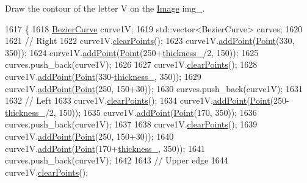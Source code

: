 Draw the contour of the letter V on the \mbox{\hyperlink{class_image}{Image}} img\+\_\+. 


\begin{DoxyCode}
1617                \{
1618     \mbox{\hyperlink{class_bezier_curve}{BezierCurve}} curve1V;
1619     std::vector<BezierCurve> curves;
1620 
1621     \textcolor{comment}{// Right}
1622     curve1V.\mbox{\hyperlink{class_bezier_curve_a0ba8ce66d5af5971ae6a1b506029728e}{clearPoints}}();
1623     curve1V.\mbox{\hyperlink{class_bezier_curve_a38d16c18b36ae45619b05e26e226cf34}{addPoint}}(\mbox{\hyperlink{class_point}{Point}}(330, 350));
1624     curve1V.\mbox{\hyperlink{class_bezier_curve_a38d16c18b36ae45619b05e26e226cf34}{addPoint}}(\mbox{\hyperlink{class_point}{Point}}(250+\mbox{\hyperlink{class_font_v1_aed8040e76be9a52833627b92f0fb4e5f}{thickness\_}}/2, 150));
1625     curves.push\_back(curve1V);
1626 
1627     curve1V.\mbox{\hyperlink{class_bezier_curve_a0ba8ce66d5af5971ae6a1b506029728e}{clearPoints}}();
1628     curve1V.\mbox{\hyperlink{class_bezier_curve_a38d16c18b36ae45619b05e26e226cf34}{addPoint}}(\mbox{\hyperlink{class_point}{Point}}(330-\mbox{\hyperlink{class_font_v1_aed8040e76be9a52833627b92f0fb4e5f}{thickness\_}}, 350));
1629     curve1V.\mbox{\hyperlink{class_bezier_curve_a38d16c18b36ae45619b05e26e226cf34}{addPoint}}(\mbox{\hyperlink{class_point}{Point}}(250, 150+30));
1630     curves.push\_back(curve1V);
1631 
1632     \textcolor{comment}{// Left}
1633     curve1V.\mbox{\hyperlink{class_bezier_curve_a0ba8ce66d5af5971ae6a1b506029728e}{clearPoints}}();
1634     curve1V.\mbox{\hyperlink{class_bezier_curve_a38d16c18b36ae45619b05e26e226cf34}{addPoint}}(\mbox{\hyperlink{class_point}{Point}}(250-\mbox{\hyperlink{class_font_v1_aed8040e76be9a52833627b92f0fb4e5f}{thickness\_}}/2, 150));
1635     curve1V.\mbox{\hyperlink{class_bezier_curve_a38d16c18b36ae45619b05e26e226cf34}{addPoint}}(\mbox{\hyperlink{class_point}{Point}}(170, 350));
1636     curves.push\_back(curve1V);
1637 
1638     curve1V.\mbox{\hyperlink{class_bezier_curve_a0ba8ce66d5af5971ae6a1b506029728e}{clearPoints}}();
1639     curve1V.\mbox{\hyperlink{class_bezier_curve_a38d16c18b36ae45619b05e26e226cf34}{addPoint}}(\mbox{\hyperlink{class_point}{Point}}(250, 150+30));
1640     curve1V.\mbox{\hyperlink{class_bezier_curve_a38d16c18b36ae45619b05e26e226cf34}{addPoint}}(\mbox{\hyperlink{class_point}{Point}}(170+\mbox{\hyperlink{class_font_v1_aed8040e76be9a52833627b92f0fb4e5f}{thickness\_}}, 350));
1641     curves.push\_back(curve1V);
1642 
1643     \textcolor{comment}{// Upper edge}
1644     curve1V.\mbox{\hyperlink{class_bezier_curve_a0ba8ce66d5af5971ae6a1b506029728e}{clearPoints}}();

\end{DoxyCode}
